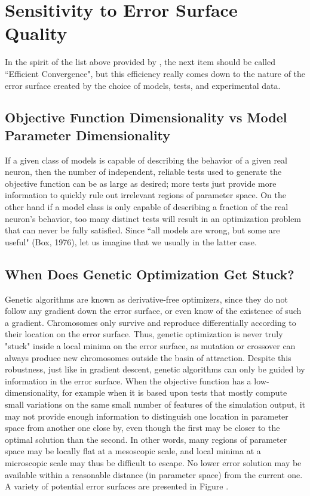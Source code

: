\section{Sensitivity to Error Surface Quality}
In the spirit of the list above provided by \cite{van2007neurofitter}, the next item should be called ``Efficient Convergence", but this efficiency really comes down to the nature of the error surface created by the choice of models, tests, and experimental data.

\subsection{Objective Function Dimensionality vs Model Parameter Dimensionality}
If a given class of models is capable of describing the behavior of a given real neuron, then the number of independent, reliable tests used to generate the objective function can be as large as desired; more tests just provide more information to quickly rule out irrelevant regions of parameter space.
On the other hand if a model class is only capable of describing a fraction of the real neuron's behavior, too many distinct tests will result in an optimization problem that can never be fully satisfied.
Since ``all models are wrong, but some are useful" (Box, 1976), let us imagine that we usually in the latter case.

\subsection{When Does Genetic Optimization Get Stuck?}
Genetic algorithms are known as derivative-free optimizers, since they do not follow any gradient down the error surface, or even know of the existence of such a gradient.
Chromosomes only survive and reproduce differentially according to their location on the error surface.
Thus, genetic optimization is never truly "stuck" inside a local minima on the error surface, as mutation or crossover can always produce new chromosomes outside the basin of attraction.
Despite this robustness, just like in gradient descent, genetic algorithms can only be guided by information in the error surface.
When the objective function has a low-dimensionality, for example when it is based upon tests that mostly compute small variations on the same small number of features of the simulation output, it may not provide enough information to distinguish one location in parameter space from another one close by, even though the first may be closer to the optimal solution than the second.
In other words, many regions of parameter space may be locally flat at a mesoscopic scale, and local minima at a microscopic scale may thus be difficult to escape.
No lower error solution may be available within a reasonable distance (in parameter space) from the current one.
A variety of potential error surfaces are presented in Figure \label{fig:test2}.

